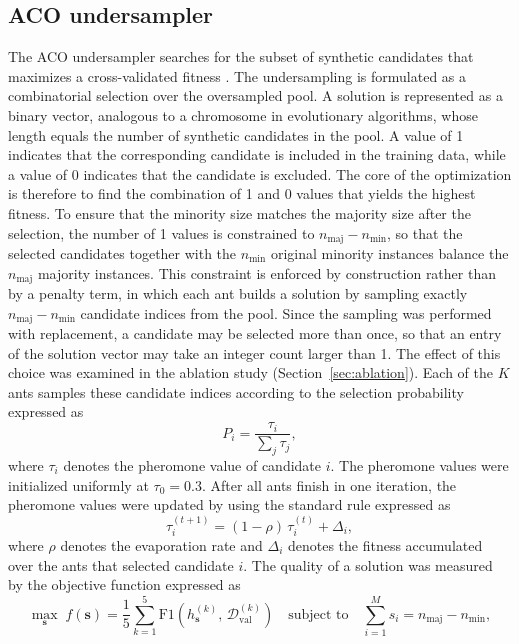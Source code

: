 \documentclass[pdflatex,sn-basic]{sn-jnl}
\begin{document}
\subsection{ACO undersampler}
\label{sec:aco}
The ACO undersampler searches for the subset of synthetic candidates that
maximizes a cross-validated fitness \citep{dorigo2006ant,
yu2013acosampling}. The undersampling is formulated as a combinatorial
selection over the oversampled pool. A solution is represented as a
binary vector, analogous to a chromosome in evolutionary algorithms,
whose length equals the number of synthetic candidates in the pool. A
value of 1 indicates that the corresponding candidate is included in the
training data, while a value of 0 indicates that the candidate is
excluded. The core of the optimization is therefore to find the
combination of 1 and 0 values that yields the highest fitness. To ensure
that the minority size matches the majority size after the selection,
the number of 1 values is constrained to $n_{\mathrm{maj}} - n_{\min}$,
so that the selected candidates together with the $n_{\min}$ original
minority instances balance the $n_{\mathrm{maj}}$ majority instances.
This constraint is enforced by construction rather than by a penalty
term, in which each ant builds a solution by sampling exactly
$n_{\mathrm{maj}} - n_{\min}$ candidate indices from the pool. Since the
sampling was performed with replacement, a candidate may be selected
more than once, so that an entry of the solution vector may take an
integer count larger than 1. The effect of this choice was examined in
the ablation study (Section~\ref{sec:ablation}). Each of the $K$ ants
samples these candidate indices according to the selection probability
expressed as
\begin{equation}
  P_i = \frac{\tau_i}{\sum_{j} \tau_j},
  \label{eq:prob}
\end{equation}
where $\tau_i$ denotes the pheromone value of candidate $i$. The
pheromone values were initialized uniformly at $\tau_0 = 0.3$. After all
ants finish in one iteration, the pheromone values were updated by using
the standard rule expressed as
\begin{equation}
  \tau_i^{(t+1)} = (1-\rho)\,\tau_i^{(t)} + \Delta_i,
  \label{eq:pheromone}
\end{equation}
where $\rho$ denotes the evaporation rate and $\Delta_i$ denotes the
fitness accumulated over the ants that selected candidate $i$. The
quality of a solution was measured by the objective function expressed
as
\begin{equation}
  \max_{\mathbf{s}}\; f(\mathbf{s}) = \frac{1}{5}\sum_{k=1}^{5}
  \mathrm{F1}\!\left(h_{\mathbf{s}}^{(k)},\,
  \mathcal{D}_{\mathrm{val}}^{(k)}\right)
  \quad \text{subject to} \quad
  \sum_{i=1}^{M} s_i = n_{\mathrm{maj}} - n_{\min},
  \label{eq:objective}
\end{equation}
\end{document}
